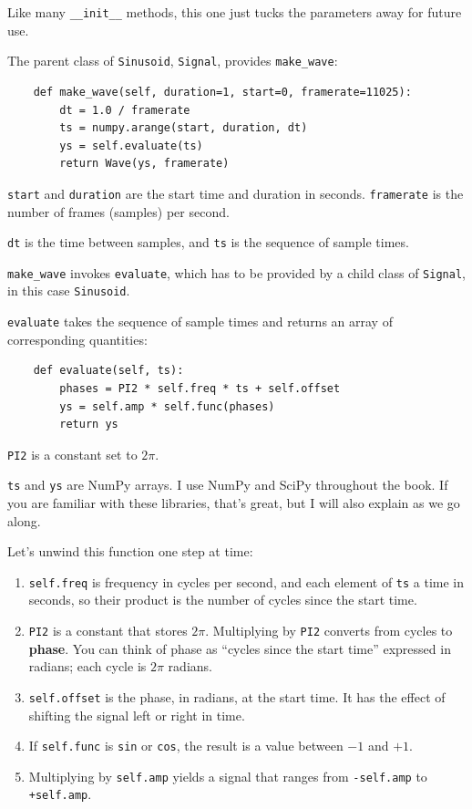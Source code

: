\documentclass[12pt]{book}
\begin{document}
Like many \verb"__init__" methods, this one just tucks the
parameters away for future use.

The parent class of {\tt Sinusoid}, {\tt Signal}, provides \verb"make_wave":

\begin{verbatim}
    def make_wave(self, duration=1, start=0, framerate=11025):
        dt = 1.0 / framerate
        ts = numpy.arange(start, duration, dt)
        ys = self.evaluate(ts)
        return Wave(ys, framerate)
\end{verbatim}

{\tt start} and {\tt duration} are the start time and duration
in seconds.  {\tt framerate} is the number of frames (samples)
per second.

{\tt dt} is the time between samples, and {\tt ts} is the sequence
of sample times.

\verb"make_wave" invokes {\tt evaluate}, which has to be provided
by a child class of {\tt Signal}, in this case {\tt Sinusoid}.

{\tt evaluate} takes the sequence of sample times and returns an array of
corresponding quantities:

\begin{verbatim}
    def evaluate(self, ts):
        phases = PI2 * self.freq * ts + self.offset
        ys = self.amp * self.func(phases)
        return ys
\end{verbatim}

{\tt PI2} is a constant set to $2 \pi$.

{\tt ts} and {\tt ys} are NumPy arrays.  I use NumPy and SciPy
throughout the book.  If you are familiar with these libraries,
that's great, but I will also explain as we go along.

Let's unwind this function one step at time:

\begin{enumerate}

\item {\tt self.freq} is frequency in cycles per second, and each
  element of {\tt ts} a time in seconds, so their product is the
  number of cycles since the start time.

\item {\tt PI2} is a constant that stores $2 \pi$.  Multiplying by
  {\tt PI2} converts from cycles to {\bf phase}.  You can think of
  phase as ``cycles since the start time'' expressed in radians; each
  cycle is $2 \pi$ radians.

\item {\tt self.offset} is the phase, in radians, at the start time.
  It has the effect of shifting the signal left or right in time.

\item If {\tt self.func} is {\tt sin} or {\tt cos}, the result is a
  value between $-1$ and $+1$.

\item Multiplying by {\tt self.amp} yields a signal that ranges from
  {\tt -self.amp} to {\tt +self.amp}.

\end{enumerate}
\end{document}
